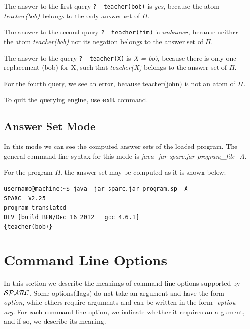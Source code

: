 \documentclass[12pt, letterpaper]{article}
\begin{document}
The answer to the first query \texttt{?- teacher(bob)} is \textit{yes}, because the atom \textit{teacher(bob)} belongs to the only answer set of $\Pi$.

The answer to the second query \texttt{?- teacher(tim)} is \textit{unknown}, because neither the atom \textit{teacher(bob)} nor its negation belongs to the answer set of $\Pi$.

The answer to the query \texttt{?- teacher(X)} is \textit{X = bob}, because there is only one replacement (bob) for X, such that \textit{teacher(X)} belongs to the answer set of $\Pi$.

For the fourth query, we see an error, because teacher(john) is not an atom of $\Pi$.

To quit the querying engine, use \textbf{exit} command.

\subsection{Answer Set Mode}

In this mode we can see the computed answer sets of the loaded program.
The general command line syntax for this mode is \textit{java -jar sparc.jar program\_file -A}.

For the program $\Pi$, the answer set may be computed as it is shown below:
\begin{verbatim}
username@machine:~$ java -jar sparc.jar program.sp -A
SPARC  V2.25
program translated
DLV [build BEN/Dec 16 2012   gcc 4.6.1]
{teacher(bob)}

\end{verbatim}

\section{Command Line Options}\label{option}

In this section we  describe the meanings of command line options supported by
${\cal SPARC}$. Some options(flags) do not take an argument and have the form \textit{-option},
while others require arguments and can be written in the form \textit{-option arg}.
For each command line option, we indicate whether it requires
an argument, and if so, we  describe its meaning.
\end{document}
